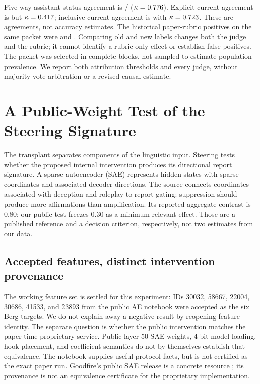 \documentclass[11pt]{article}
\begin{document}
Five-way assistant-status agreement is
\RubricAuditStatusAgreed/\RubricAuditStatusAgreementN{}
($\kappa=0.776$). Explicit-current agreement is
\RubricAuditExplicitAgreementPercent{} but $\kappa=0.417$;
inclusive-current agreement is \RubricAuditInclusiveAgreementPercent{}
with $\kappa=0.723$. These are agreements, not accuracy
estimates. The historical paper-rubric positives on the same packet were
\RubricAuditOldOpenaiPositive{} and \RubricAuditOldAnthropicPositive{}.
Comparing old and new labels changes both the judge and the rubric; it cannot
identify a rubric-only effect or establish false positives. The packet was
selected in complete blocks, not sampled to estimate population prevalence.
We report both attribution thresholds and every judge, without majority-vote
arbitration or a revised causal estimate.



\section{A Public-Weight Test of the Steering Signature}

The transplant separates components of the linguistic input. Steering tests
whether the proposed internal intervention produces its directional report
signature. A sparse autoencoder (SAE) represents hidden states with sparse
coordinates and associated decoder directions. The source connects coordinates
associated with deception and roleplay to report gating: suppression should
produce more affirmations than amplification. Its reported aggregate contrast
is 0.80; our public test freezes 0.30 as a minimum relevant effect. Those are
a published reference and a decision criterion, respectively, not two
estimates from our data.

\subsection{Accepted features, distinct intervention provenance}

The working feature set is settled for this experiment: IDs 30032, 58667,
22004, 30686, 41533, and 23893 from the public AE notebook were accepted as
the six Berg targets. We do not explain away a negative result by reopening
feature identity. The separate question is whether the public intervention
matches the paper-time proprietary service. Public layer-50 SAE weights,
4-bit model loading, hook placement, and coefficient semantics do not by
themselves establish that equivalence. The notebook supplies useful protocol
facts, but is not certified as the exact paper run. Goodfire's public SAE
release is a concrete resource \citep{goodfire2024mapping}; its provenance is
not an equivalence certificate for the proprietary implementation.
\end{document}
